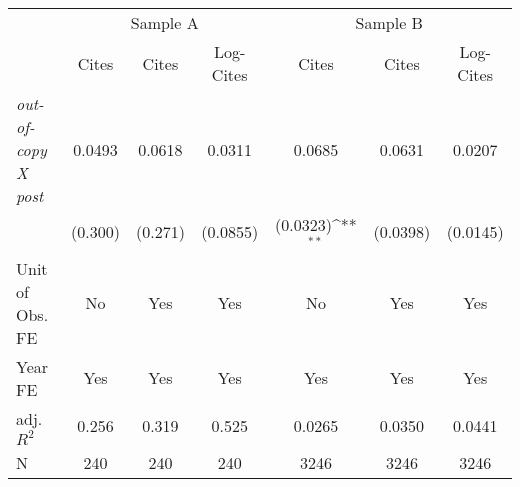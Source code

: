 {
\def\sym#1{\ifmmode^{#1}\else\(^{#1}\)\fi}
\begin{tabular*}{\hsize}{@{\hskip\tabcolsep\extracolsep\fill}l*{6}{c}}
\toprule
            &\multicolumn{3}{c}{Sample A}                                     &\multicolumn{3}{c}{Sample B}                                     \\\cmidrule(lr){2-4}\cmidrule(lr){5-7}
            &\multicolumn{1}{c}{Cites}&\multicolumn{1}{c}{Cites}&\multicolumn{1}{c}{Log-Cites}&\multicolumn{1}{c}{Cites}&\multicolumn{1}{c}{Cites}&\multicolumn{1}{c}{Log-Cites}\\
\midrule
\emph{out-of-copy X post}&      0.0493         &      0.0618         &      0.0311         &      0.0685         &      0.0631         &      0.0207         \\
            &     (0.300)         &     (0.271)         &    (0.0855)         &    (0.0323)\sym{**} &    (0.0398)         &    (0.0145)         \\
\midrule
Unit of Obs. FE&          No         &         Yes         &         Yes         &          No         &         Yes         &         Yes         \\
Year FE     &         Yes         &         Yes         &         Yes         &         Yes         &         Yes         &         Yes         \\
adj. $R^2$  &       0.256         &       0.319         &       0.525         &      0.0265         &      0.0350         &      0.0441         \\
N           &         240         &         240         &         240         &        3246         &        3246         &        3246         \\
\bottomrule
\end{tabular*}
}
